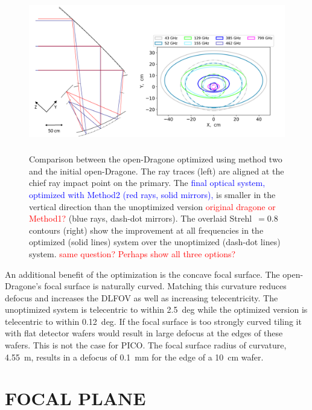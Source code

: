 \documentclass[]{spie}  %
\newcommand{\comr}[1]{\textcolor{red}{#1}}
\newcommand{\comb}[1]{\textcolor{blue}{#1}}
\begin{document}
\begin{figure} [ht]
\begin{center}
\includegraphics[height=7cm]{jpl_vs_V3D.png}
\end{center}
\caption { \label{fig:compare} 
Comparison between the open-Dragone optimized using method two and the initial open-Dragone.  
The ray traces (left) are aligned at the chief ray impact point on the primary. 
The \comb{final optical system, optimized with Method2 (red rays, solid mirrors),} is smaller in the vertical direction 
than the unoptimized version \comr{original dragone or Method1?} (blue rays, dash-dot mirrors). The overlaid Strehl~$=0.8$ contours 
(right) show the improvement at all frequencies in the optimized (solid lines) system over the unoptimized (dash-dot lines) system. 
\comr{same question? Perhaps show all three options?}
}
\end{figure} 

An additional benefit of the optimization is the concave focal surface. The open-Dragone's focal surface is naturally curved.  Matching this 
curvature reduces defocus and increases the DLFOV as well as increasing telecentricity.  The unoptimized system is telecentric to within 
2.5~deg while the optimized version is telecentric to within 0.12~deg. If the focal surface is too strongly curved tiling it with flat detector 
wafers would result in large defocus at the edges of these wafers.  This is not the case for PICO. The focal surface radius of curvature, 4.55~m, 
results in a defocus of 0.1~mm for the edge of a 10~cm wafer. 



\section{FOCAL PLANE}
\label{sec:focalplane}
\end{document}
